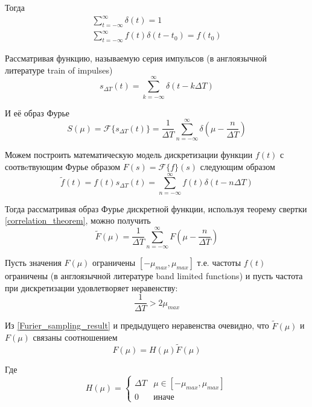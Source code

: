 \documentclass[oneside,final,14pt]{extreport}
\begin{document}
Тогда
\begin{gather}
\sum_{t = - \infty}^{\infty} \delta(t) 
=
1
\\
\sum_{t = - \infty}^{\infty} f(t) 
\delta(t - t_{0}) 
=
f(t_{0})
\end{gather} 

Рассматривая функцию, называемую серия импульсов (в англоязычной литературе train of impulses)
\begin{equation}
s_{\varDelta T}(t) 
=
\sum_{k=-\infty}^{\infty}
\delta(t - k\varDelta T)
\end{equation}

И её образ Фурье 
\begin{equation}
S(\mu) = \mathcal{F}
\{ s_{\varDelta T}(t)  \}
=
\frac{1}{\varDelta T}
\sum_{n = - \infty}^{\infty}
\delta(
\mu - \frac{n}{\varDelta T}
)
\end{equation}

Можем построить математическую модель дискретизации
функции $f(t)$ с соотвeтвующим Фурье образом $F(s) = \mathcal{F}\{f\}(s)$  следующим образом
\begin{equation}
\tilde{f}(t) = 
f(t)s_{\varDelta T}(t)
=
\sum_{n = -\infty}^{\infty}
f(t)
\delta(t - n\varDelta T)
\end{equation}

Тогда рассматривая образ Фурье дискретной функции, используя теорему свертки \ref{correlation_theorem},  можно получить \cite{Gonzalez}
\begin{equation}
\tilde{F}(\mu) = 
\frac{1}{\varDelta T}
\sum_{n = - \infty}^{\infty}
F(
\mu - \frac{n}{\varDelta T}
)
\label{Furier_sampling_result}
\end{equation}

Пусть значения $F(\mu)$  ограничены $[-\mu_{max},\mu_{max} ] $ т.е. частоты $f(t)$ ограничены  (в англоязычной литературе band limited functions) и 
пусть частота при дискретизации удовлетворяет неравенству:
\begin{equation}
\frac{1}{\varDelta T} 
>
2\mu_{max}
\end{equation}

Из \ref{Furier_sampling_result} и предыдущего неравенства очевидно, что $\tilde{F}(\mu)$ и $F(\mu)$ связаны соотношением
\begin{equation}
F(\mu)
=
H(\mu)
\tilde{F}(\mu)
\end{equation}

Где 
\begin{equation}
H(\mu)
=
\begin{cases}
\varDelta T & 
\mu \in [-\mu_{max},\mu_{max}] \\
0 & иначе
\end{cases}
\end{equation}
\end{document}
